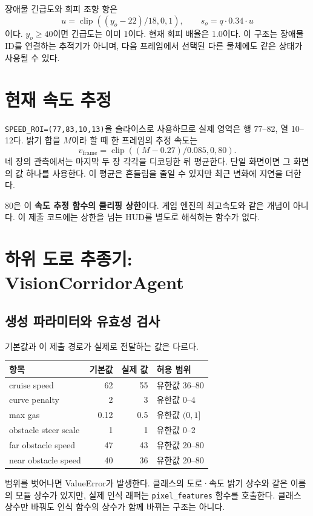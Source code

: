 \documentclass[11pt,a4paper]{article}
\newcommand{\code}[1]{{\small\nolinkurl{#1}}}
\newcommand{\clip}{\operatorname{clip}}
\begin{document}
장애물 긴급도와 회피 조향 항은
\[
 u=\clip((y_o-22)/18,0,1),\qquad s_o=q\cdot0.34\cdot u
\]
이다. $y_o\ge40$이면 긴급도는 이미 1이다. 현재 회피 배율은 1.0이다. 이 구조는 장애물 ID를 연결하는 추적기가 아니며, 다음 프레임에서 선택된 다른 물체에도 같은 상태가 사용될 수 있다.

\section{현재 속도 추정}
\code{SPEED_ROI=(77,83,10,13)}을 슬라이스로 사용하므로 실제 영역은 행 77--82, 열 10--12다. 밝기 합을 $M$이라 할 때 한 프레임의 추정 속도는
\[
 v_{\mathrm{frame}}=\clip((M-0.27)/0.085,0,80).
\]
네 장의 관측에서는 마지막 두 장 각각을 디코딩한 뒤 평균한다. 단일 화면이면 그 화면의 값 하나를 사용한다. 이 평균은 흔들림을 줄일 수 있지만 최근 변화에 지연을 더한다.

80은 이 \textbf{속도 추정 함수의 클리핑 상한}이다. 게임 엔진의 최고속도와 같은 개념이 아니다. 이 제출 코드에는 상한을 넘는 HUD를 별도로 해석하는 함수가 없다.

\section{하위 도로 추종기: VisionCorridorAgent}
\subsection{생성 파라미터와 유효성 검사}
기본값과 이 제출 경로가 실제로 전달하는 값은 다르다.
\par\noindent\begin{tabularx}{\linewidth}{@{}lrrX@{}}\toprule
항목 & 기본값 & 실제 값 & 허용 범위 \\\midrule
cruise speed & 62 & 55 & 유한값 36--80 \\
curve penalty & 2 & 3 & 유한값 0--4 \\
max gas & 0.12 & 0.5 & 유한값 $(0,1]$ \\
obstacle steer scale & 1 & 1 & 유한값 0--2 \\
far obstacle speed & 47 & 43 & 유한값 20--80 \\
near obstacle speed & 40 & 36 & 유한값 20--80 \\\bottomrule
\end{tabularx}
범위를 벗어나면 ValueError가 발생한다. 클래스의 도로·속도 밝기 상수와 같은 이름의 모듈 상수가 있지만, 실제 인식 래퍼는 \code{pixel_features} 함수를 호출한다. 클래스 상수만 바꿔도 인식 함수의 상수가 함께 바뀌는 구조는 아니다.
\end{document}

